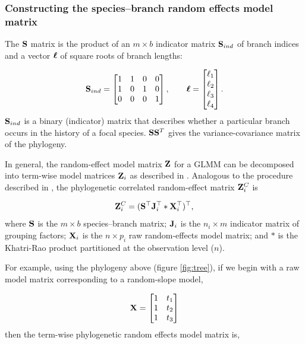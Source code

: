 \documentclass[12pt]{article}
\begin{document}
\subsubsection*{Constructing the species--branch random effects model matrix}

The ${\mathbf S}$ matrix is the product of an $m \times b$ indicator matrix ${\mathbf S}_{ind}$ of branch indices and a vector ${\boldsymbol \ell}$ of square roots of branch lengths:

\[
{\mathbf S}_{ind} = \begin{bmatrix}
1 & 1 & 0 & 0 \\ 
1 & 0 & 1 & 0 \\ 
0 & 0 & 0 & 1
\end{bmatrix} , 
\qquad
{\boldsymbol \ell} = \begin{bmatrix}
\ell_1 \\
\ell_2 \\
\ell_3 \\
\ell_4 
\end{bmatrix} .
\]
${\mathbf S}_{ind}$ is a binary (indicator) matrix that describes whether a particular branch occurs in the history of a focal species. 
${\mathbf S} {\mathbf S}^T$ gives the variance-covariance matrix of the phylogeny. 

In general, the random-effect model matrix ${\mathbf Z}$ for a GLMM can be decomposed into term-wise model matrices ${\mathbf Z}_{i}$ as described in \citet{bates2015fitting}.
Analogous to the procedure described in \citet{bates2015fitting}, the phylogenetic correlated random-effect matrix ${\mathbf Z}^{C}_{i}$ is

\begin{equation}
{\mathbf Z}^{C}_{i} = ({\mathbf S}^{\top}{\mathbf J}^{\top}_{i} \ast {\mathbf X}^{\top}_{i})^{\top}, \label{eq:ZC}
\end{equation}
where ${\mathbf S}$ is the $m \times b$ species--branch matrix; ${\mathbf J}_{i}$ is the $n_i \times m$ indicator matrix of grouping factors; ${\mathbf X}_{i}$ is the $n \times p_{i}$ raw random-effects model matrix; and $\ast$ is the Khatri-Rao product \citep{khatri1968solutions} partitioned at the observation level ($n$).

For example, using the phylogeny above (figure \ref{fig:tree}), if we begin with a raw model matrix corresponding to a random-slope model, 

\[
{\mathbf X} = \begin{bmatrix}
1 & t_1  \\ 
1 & t_2  \\ 
1 & t_3 
\end{bmatrix} 
\]
then the term-wise phylogenetic random effects model matrix is,
\end{document}

